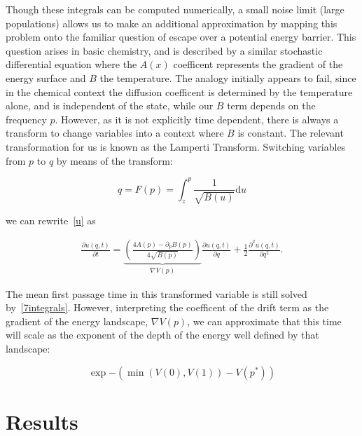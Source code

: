 \documentclass{article}
\newcommand{\ud}{\mathrm{d}}
\begin{document}
Though these integrals can be computed numerically, a small noise limit (large populations) allows us to make an additional approximation by mapping this problem onto the familiar question of escape over a potential energy barrier.  This question arises in basic chemistry, and is described by a similar stochastic differential equation where the $A(x)$ coefficent represents the gradient of the energy surface and $B$ the temperature.  The analogy initially appears to fail, since in the chemical context the diffusion coefficent is determined by the temperature alone, and is independent of the state, while our $B$ term depends on the frequency $p$.  However, as it is not explicitly time dependent, there is always a transform to change variables into a context where $B$ is constant.  The relevant transformation for us is known as the Lamperti Transform.  Switching variables from $p$ to $q$ by means of the transform:

\begin{equation}
q = F(p) = \int_z^{p} \frac{1}{\sqrt{B(u)}} \ud u
\label{p_to_q}
\end{equation}

we can rewrite~\eqref{u} as

\begin{align}
\frac{\partial u(q,t)}{\partial t} = \underbrace{\left(\frac{4 A(p)- \partial_p B(p) }{4\sqrt{B(p)}}  \right)}_{\nabla V(p)} \frac{\partial u(q,t)}{\partial q} + \frac{1}{2} \frac{\partial^2 u(q,t)}{\partial q^2}.
\label{new_u}
\end{align}

The mean first passage time in this transformed variable is still solved by~\eqref{7integrals}.  However, interpreting the coefficent of the drift term as the gradient of the energy landscape, $\nabla V(p)$, we can approximate that this time will scale as the exponent of the depth of the energy well defined by that landscape:

\begin{equation}
\exp{- (\min(V(0), V(1)) - V(p^*) )}
\end{equation}




\section{Results}


\end{document}
